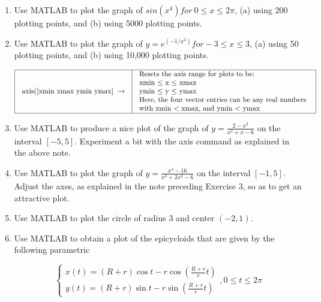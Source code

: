 \documentclass[../main.tex]{subfiles}
\begin{document}
\begin{enumerate}
\item Use MATLAB to plot the graph of $sin(x^4)  for \ {}0 \le x \le  2\pi$, (a) using 200 plotting points, and (b) using 5000 plotting points. 
\item Use MATLAB to plot the graph of $y =e^{(-1/x^2)} for -3 \le x \le  3$, (a) using 50 plotting points, and
(b) using 10,000 plotting points. 

$
\begin{array}{|l|l|}
\hline \begin{array}{l}
\text {axis([xmin xmax ymin ymax] } \rightarrow \\
\end{array} & \begin{array}{l}
\text {Resets the axis range for plots to be: } \\
\text {xmin $\leq$ x $\leq$ xmax }\\
\text {ymin $\leq$ y $\leq$ ymax }\\
\text{Here, the four vector entries can be any real numbers }\\
\text {with xmin < xmax, and ymin < ymax}

\end{array} \\
\hline
\end{array}
$\\

\item Use MATLAB to produce a nice plot of the graph of $y=\frac{2-x^{2}}{x^{2}+x-6}$ on the interval $[-5,5]$. Experiment a bit with the axis command as explained in the above note.
\item Use MATLAB to plot the graph of $y=\frac{x^{4}-16}{x^{3}+2 x^{2}-6}$ on the interval $[-1,5]$. Adjust the axes, as explained in the note preceding Exercise 3, so as to get an attractive plot.
\item Use MATLAB to plot the circle of radius 3 and center $(-2,1)$.
\item Use MATLAB to obtain a plot of the epicycloids that are given by the following parametric 

\begin{equation}
\left\{\begin{array}{l}
x(t)=(R+r) \cos t-r \cos \left(\frac{R+r}{r} t\right) \\
y(t)=(R+r) \sin t-r \sin \left(\frac{R+r}{r} t\right)
\end{array}, 0 \leq t \leq 2 \pi\right.
\end{equation}


\end{enumerate}
\end{document}
